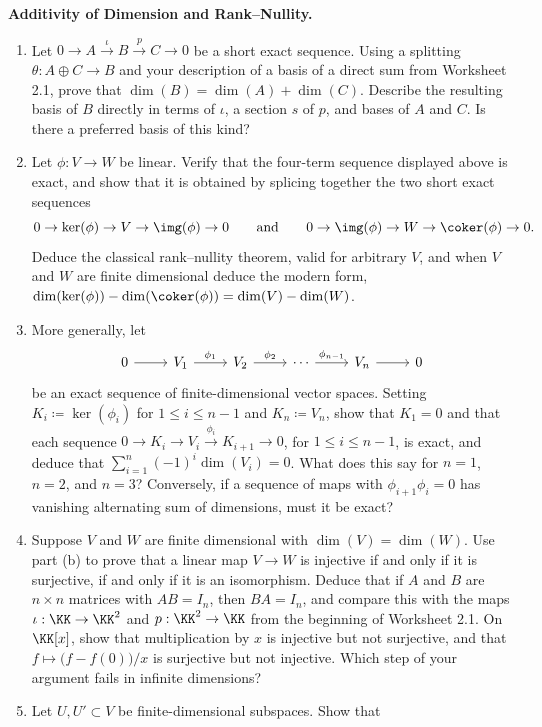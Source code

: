 \documentclass[12pt,reqno]{amsart}
\begin{document}
\begin{problems}
\item\label{t:dimension} \textbf{Additivity of Dimension and Rank--Nullity.}
\begin{enumerate}
\item Let $0\to A\xrightarrow{\iota}B\xrightarrow{p}C\to0$ be a short exact sequence. Using a splitting $\theta:A\oplus C\to B$ and your description of a basis of a direct sum from Worksheet 2.1, prove that $\dim(B)=\dim(A)+\dim(C)$. Describe the resulting basis of $B$ directly in terms of $\iota$, a section $s$ of $p$, and bases of $A$ and $C$. Is there a preferred basis of this kind?
\item Let $\phi:V\to W$ be linear. Verify that the four-term sequence displayed above is exact, and show that it is obtained by splicing together the two short exact sequences
\[
0\to\ker(\phi)\to V\to\img(\phi)\to0
\qquad\text{and}\qquad
0\to\img(\phi)\to W\to\coker(\phi)\to0.
\]
Deduce the classical rank--nullity theorem, valid for arbitrary $V$, and when $V$ and $W$ are finite dimensional deduce the modern form, $\dim(\ker(\phi))-\dim(\coker(\phi))=\dim(V)-\dim(W)$.
\item More generally, let
\[
\begin{tikzcd}
0 \arrow[r] & V_1 \arrow[r,"\phi_1"] & V_2 \arrow[r,"\phi_2"] & \cdots \arrow[r,"\phi_{n-1}"] & V_n \arrow[r] & 0
\end{tikzcd}
\]
be an exact sequence of finite-dimensional vector spaces. Setting $K_i\coloneqq\ker(\phi_i)$ for $1\leq i\leq n-1$ and $K_n\coloneqq V_n$, show that $K_1=0$ and that each sequence $0\to K_i\to V_i\xrightarrow{\phi_i}K_{i+1}\to0$, for $1\leq i\leq n-1$, is exact, and deduce that $\sum_{i=1}^n(-1)^i\dim(V_i)=0$. What does this say for $n=1$, $n=2$, and $n=3$? Conversely, if a sequence of maps with $\phi_{i+1}\phi_i=0$ has vanishing alternating sum of dimensions, must it be exact?
\item Suppose $V$ and $W$ are finite dimensional with $\dim(V)=\dim(W)$. Use part (b) to prove that a linear map $V\to W$ is injective if and only if it is surjective, if and only if it is an isomorphism. Deduce that if $A$ and $B$ are $n\times n$ matrices with $AB=I_n$, then $BA=I_n$, and compare this with the maps $\iota:\KK\to\KK^2$ and $p:\KK^2\to\KK$ from the beginning of Worksheet 2.1. On $\KK[x]$, show that multiplication by $x$ is injective but not surjective, and that $f\mapsto\big(f-f(0)\big)/x$ is surjective but not injective. Which step of your argument fails in infinite dimensions?
\item Let $U,U'\subset V$ be finite-dimensional subspaces. Show that

\end{enumerate}
\end{problems}
\end{document}
